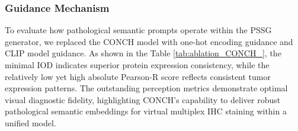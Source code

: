 \documentclass[journal,twoside,web]{ieeecolor}
\begin{document}







\subsubsection{Guidance Mechanism}
To evaluate how pathological semantic prompts operate within the PSSG generator, we replaced the CONCH model with one-hot encoding guidance and CLIP model guidance. As shown in the Table \ref{tab:ablation_CONCH_}, the minimal IOD indicates superior protein expression consistency, while the relatively low yet high absolute Pearson-R score reflects consistent tumor expression patterns. The outstanding perception metrics demonstrate optimal visual diagnostic fidelity, highlighting CONCH's capability to deliver robust pathological semantic embeddings for virtual multiplex IHC staining within a unified model.
\end{document}
